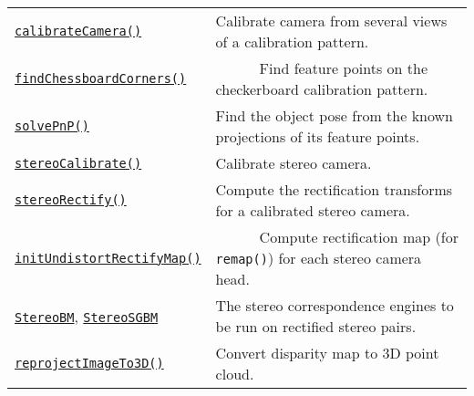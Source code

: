 \documentclass[10pt,landscape]{article}
\begin{document}
\begin{multicols}{3}
\begin{tabular}{@{}p{\the\MyLen}%
                @{}p{\linewidth-\the\MyLen}@{}}

\texttt{\href{http://opencv.itseez.com/modules/calib3d/doc/camera_calibration_and_3d_reconstruction.html\#calibratecamera}{calibrateCamera()}} & Calibrate camera from several views of a calibration pattern. \\

\texttt{\href{http://opencv.itseez.com/modules/calib3d/doc/camera_calibration_and_3d_reconstruction.html\#findchessboardcorners}{findChessboardCorners()}} & \ \ \ \ \ \ Find feature points on the checkerboard calibration pattern. \\

\texttt{\href{http://opencv.itseez.com/modules/calib3d/doc/camera_calibration_and_3d_reconstruction.html\#solvepnp}{solvePnP()}} & Find the object pose from the known projections of its feature points. \\

\texttt{\href{http://opencv.itseez.com/modules/calib3d/doc/camera_calibration_and_3d_reconstruction.html\#stereocalibrate}{stereoCalibrate()}} & Calibrate stereo camera. \\

\texttt{\href{http://opencv.itseez.com/modules/calib3d/doc/camera_calibration_and_3d_reconstruction.html\#stereorectify}{stereoRectify()}} & Compute the rectification transforms for a calibrated stereo camera.\\

\texttt{\href{http://opencv.itseez.com/modules/imgproc/doc/geometric_transformations.html\#initundistortrectifymap}{initUndistortRectifyMap()}} & \ \ \ \ \ \ Compute rectification map (for \texttt{remap()}) for each stereo camera head.\\

\texttt{\href{http://opencv.itseez.com/modules/calib3d/doc/camera_calibration_and_3d_reconstruction.html\#StereoBM}{StereoBM}}, \texttt{\href{http://opencv.itseez.com/modules/calib3d/doc/camera_calibration_and_3d_reconstruction.html\#StereoSGBM}{StereoSGBM}} & The stereo correspondence engines to be run on rectified stereo pairs.\\

\texttt{\href{http://opencv.itseez.com/modules/calib3d/doc/camera_calibration_and_3d_reconstruction.html\#reprojectimageto3d}{reprojectImageTo3D()}} & Convert disparity map to 3D point cloud.\\


\end{tabular}
\end{multicols}
\end{document}
